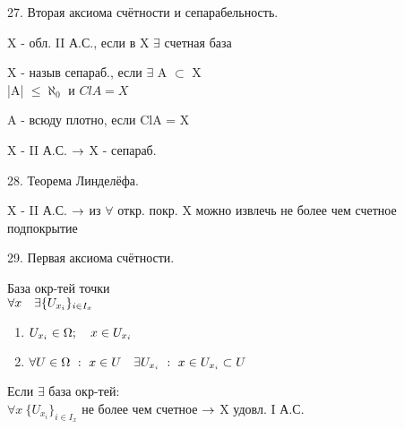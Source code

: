 \documentclass[11pt, fleqn]{article}
\begin{document}
    \begin{question}{27. Вторая аксиома счётности и сепарабельность.}
        \begin{definition}
            X - обл. II А.С., если в X $\exists$ счетная база
        \end{definition}

        \begin{definition}
            X - назыв сепараб., если $\exists$ A $\subset$ X\\
            |A| $\leq \aleph_0$ и $Cl A = X$
        \end{definition}

        \begin{definition}
            A - всюду плотно, если ClA = X
        \end{definition}

        \begin{theorem}
            X - II А.С. $\rightarrow$ X - сепараб.
        \end{theorem}
    \end{question}

    \begin{question}{28. Теорема Линделёфа.}
        \begin{theorem}
            X - II А.С. $\rightarrow$ из $\forall$ откр. покр. X можно извлечь не более чем счетное подпокрытие
        \end{theorem}
    \end{question}

    \begin{question}{29. Первая аксиома счётности.}
        \begin{definition}
            База окр-тей точки\\
            $\forall x \quad \exists \{U_{x_i}\}_{i \in I_x}$\\
            \begin{enumerate}
                \item $U_{x_i} \in \Omega; \quad x \in U_{x_i}$
                \item $\forall U \in \Omega \ : \ x \in U \quad \exists U_{x_i} \ : \ x \in U_{x_i} \subset U$
            \end{enumerate}
        \end{definition}

        \begin{definition}
            Если $\exists$  база окр-тей:\\
            $\forall x \ \{U_{x_i}\}_{i \in I_x}$ не более чем счетное $\rightarrow$ X удовл. I А.С.
        \end{definition}
    \end{question}
\end{document}
